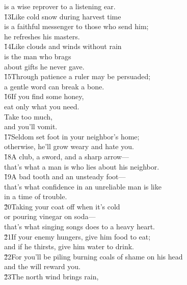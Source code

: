 \begin{poetry}
\poemll    is a wise reprover to a listening ear. \\
\poeml \v{13}Like cold snow during harvest time \\
\poemll    is a faithful messenger to those who send him; \\
\poemlll       he refreshes his masters. \\
\poeml \v{14}Like clouds and winds without rain \\
\poemll    is the man who brags \\
\poemlll       about gifts he never gave. \\
\poeml \v{15}Through patience a ruler may be persuaded; \\
\poemll    a gentle word can break a bone. \\
\poeml \v{16}If you find some honey, \\
\poemll    eat only what you need. \\
\poeml Take too much, \\
\poemll    and you'll vomit. \\
\poeml \v{17}Seldom set foot in your neighbor's home; \\
\poemll    otherwise, he'll grow weary and hate you. \\
\poeml \v{18}A club, a sword, and a sharp arrow--- \\
\poemll    that's what a man is who lies about his neighbor. \\
\poeml \v{19}A bad tooth and an unsteady foot--- \\
\poemll    that's what confidence in an unreliable man is like \\
\poemlll       in a time of trouble. \\
\poeml \v{20}Taking your coat off when it's cold \\
\poemll    or pouring vinegar on soda--- \\
\poemlll       that's what singing songs does to a heavy heart. \\
\poeml \v{21}If your enemy hungers, give him food to eat; \\
\poemll    and if he thirsts, give him water to drink. \\
\poeml \v{22}For you'll be piling burning coals of shame on his head \\
\poemll    and the  will reward you. \\
\poeml \v{23}The north wind brings rain, \\

\end{poetry}
